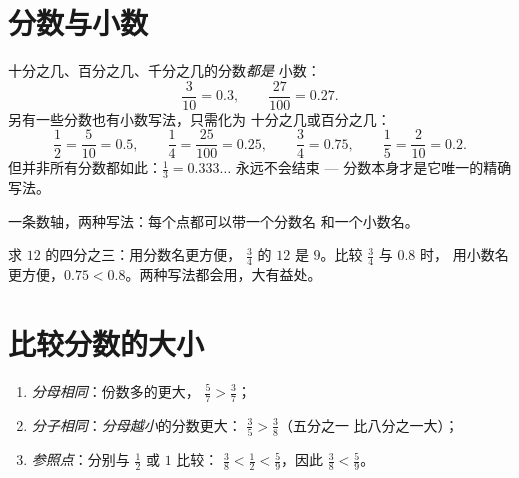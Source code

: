 \section{分数与小数}

\begin{proposition}[可以写成小数的分数]\label{prop:g5:fractions:decimal}
十分之几、百分之几、千分之几的分数\emph{都是}
小数：
\[
\frac{3}{10} = 0.3, \qquad \frac{27}{100} = 0.27 .
\]
另有一些分数也有小数写法，只需化为
十分之几或百分之几：
\[
\frac{1}{2} = \frac{5}{10} = 0.5, \qquad
\frac{1}{4} = \frac{25}{100} = 0.25, \qquad
\frac{3}{4} = 0.75, \qquad
\frac{1}{5} = \frac{2}{10} = 0.2 .
\]
但并非所有分数都如此：$\frac13 = 0.333\dots$ 永远不会结束 --- 
分数本身才是它唯一的精确写法。
\end{proposition}
\admitted

\begin{omfigure}

{\small 一条数轴，两种写法：每个点都可以带一个分数名
和一个小数名。}
\end{omfigure}

\begin{example}[选择更方便的名字]\label{ex:g5:fractions:choose}
求 $12$ 的四分之三：用分数名更方便，
$\frac34$ 的 $12$ 是 $9$。比较 $\frac34$ 与 $0.8$ 时，
用小数名更方便，$0.75 < 0.8$。两种写法都会用，大有益处。
\end{example}

\section{比较分数的大小}

\begin{method}[三种比较方法]\label{met:g5:fractions:compare}
\begin{enumerate}
  \item \emph{分母相同}：份数多的更大，
        $\frac57 > \frac37$；
  \item \emph{分子相同}：\emph{分母越小}的分数更大：
        $\frac35 > \frac38$（五分之一
        比八分之一大）；
  \item \emph{参照点}：分别与 $\frac12$ 或 $1$ 比较：
        $\frac38 < \frac12 < \frac59$，因此 $\frac38 < \frac59$。
\end{enumerate}
\end{method}

